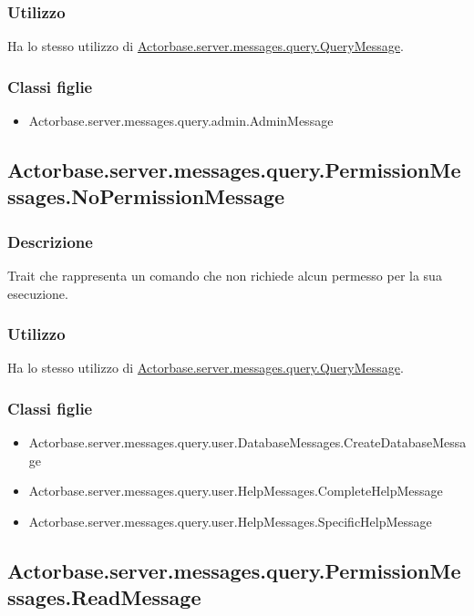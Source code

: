 \documentclass[a4paper]{article}
\begin{document}
			\subsubsection{Utilizzo}
				Ha lo stesso utilizzo di \hyperref[QueryMessage]{Actorbase.server.messages.query.QueryMessage}.
				
			\subsubsection{Classi figlie}
				\begin{itemize}
					\item Actorbase.server.messages.query.admin.AdminMessage
				\end{itemize}
		
		\subsection{Actorbase.server.messages.query.PermissionMessages.NoPermissionMessage}
			\subsubsection{Descrizione}
				Trait che rappresenta un comando che non richiede alcun permesso per la sua esecuzione.
				
			\subsubsection{Utilizzo}
				Ha lo stesso utilizzo di \hyperref[QueryMessage]{Actorbase.server.messages.query.QueryMessage}.
				
			\subsubsection{Classi figlie}
				\begin{itemize}
					\item Actorbase.server.messages.query.user.DatabaseMessages.CreateDatabaseMessage
					\item Actorbase.server.messages.query.user.HelpMessages.CompleteHelpMessage
					\item Actorbase.server.messages.query.user.HelpMessages.SpecificHelpMessage
				\end{itemize}
				
		\subsection{Actorbase.server.messages.query.PermissionMessages.ReadMessage}
\end{document}
